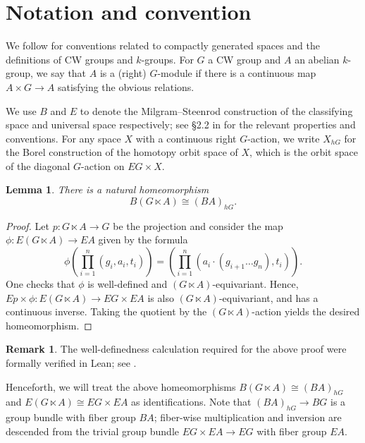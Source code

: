 \documentclass[12 pt]{article}
\newtheorem{lemma}[theorem]{Lemma}
\theoremstyle{definition}
\newtheorem{remark}[theorem]{Remark}
\begin{document}
\section{Notation and convention}
We follow \cite{Ja} for conventions related to compactly generated spaces and the definitions of CW groups and $k$-groups. For $G$ a CW group and $A$ an abelian $k$-group, we say that $A$ is a (right) $G$-module if there is a continuous map $A\times G\to A$ satisfying the obvious relations.

We use $B$ and $E$ to denote the Milgram--Steenrod construction of the classifying space and universal space respectively; see \S2.2 in \cite{Ja} for the relevant properties and conventions. For any space $X$ with a continuous right $G$-action, we write $X_{hG}$ for the Borel construction of the homotopy orbit space of $X$, which is the orbit space of the diagonal $G$-action on $EG\times X$.

\begin{lemma}\label{hom orb}
There is a natural homeomorphism
$$B(G\ltimes A)\cong (BA)_{hG}.$$
\end{lemma}

\begin{proof}
Let $p:G\ltimes A\to G$ be the projection and consider the map $\phi:E(G\ltimes A)\to EA$ given by the formula
\begin{equation}\label{E(semi-dir)}
\phi\left(\prod_{i=1}^n(g_i,a_i,t_i)\right)=\left(\prod_{i=1}^n(a_i\cdot(g_{i+1}\dots g_n),t_i)\right).
\end{equation}
One checks that $\phi$ is well-defined and $(G\ltimes A)$-equivariant. Hence, $Ep\times \phi:E(G\ltimes A)\to EG\times EA$ is also $(G\ltimes A)$-equivariant, and has a continuous inverse. Taking the quotient by the $(G\ltimes A)$-action yields the desired homeomorphism.
\end{proof}

\begin{remark}
The well-definedness calculation required for the above proof were formally verified in Lean; see .
\end{remark}

Henceforth, we will treat the above homeomorphisms $B(G\ltimes A)\cong (BA)_{hG}$ and $E(G\ltimes A)\cong EG\times EA$ as identifications. Note that $(BA)_{hG}\to BG$ is a group bundle with fiber group $BA$; fiber-wise multiplication and inversion are descended from the trivial group bundle $EG\times EA\to EG$ with fiber group $EA$.
\end{document}
